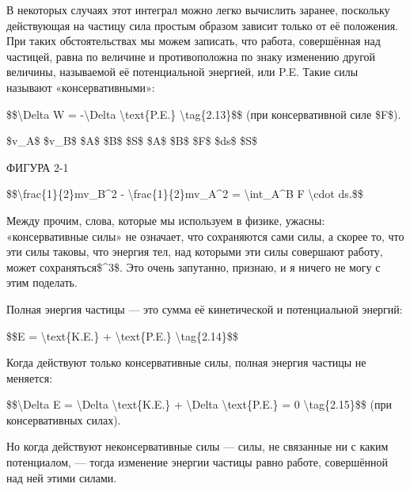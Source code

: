 \documentclass[10pt,oneside]{article}
\newcommand{\TipsRunning}[1]{\par\vspace{2bp}{\centering\footnotesize #1\par}\vspace{2bp}}
\begin{document}
В некоторых случаях этот интеграл можно легко вычислить заранее, поскольку действующая на частицу сила простым образом зависит только от её положения. При таких обстоятельствах мы можем записать, что работа, совершённая над частицей, равна по величине и противоположна по знаку изменению другой величины, называемой её потенциальной энергией, или P.E. Такие силы называют «консервативными»:\par

\$\$\textbackslash{}Delta W = -\textbackslash{}Delta \textbackslash{}text\{P.E.\} \textbackslash{}tag\{2.13\}\$\$ (при консервативной силе \$F\$).\par

\TipsRunning{З А К О Н Ы  И  И Н Т У И Ц И Я \textbackslash{}textbullet\{\} 6 5}

\$v\_A\$ \$v\_B\$ \$A\$ \$B\$ \$S\$ \$A\$ \$B\$ \$F\$ \$ds\$ \$S\$\par

ФИГУРА 2-1\par

\$\$\textbackslash{}frac\{1\}\{2\}mv\_B\textasciicircum{}2 - \textbackslash{}frac\{1\}\{2\}mv\_A\textasciicircum{}2 = \textbackslash{}int\_A\textasciicircum{}B F \textbackslash{}cdot ds.\$\$\par

Между прочим, слова, которые мы используем в физике, ужасны: «консервативные силы» не означает, что сохраняются сами силы, а скорее то, что эти силы таковы, что энергия тел, над которыми эти силы совершают работу, может сохраняться\$\textasciicircum{}3\$. Это очень запутанно, признаю, и я ничего не могу с этим поделать.\par

Полная энергия частицы --- это сумма её кинетической и потенциальной энергий:\par

\$\$E = \textbackslash{}text\{K.E.\} + \textbackslash{}text\{P.E.\}  \textbackslash{}tag\{2.14\}\$\$\par

Когда действуют только консервативные силы, полная энергия частицы не меняется:\par

\$\$\textbackslash{}Delta E = \textbackslash{}Delta \textbackslash{}text\{K.E.\} + \textbackslash{}Delta \textbackslash{}text\{P.E.\} = 0 \textbackslash{}tag\{2.15\}\$\$ (при консервативных силах).\par

Но когда действуют неконсервативные силы --- силы, не связанные ни с каким потенциалом, --- тогда изменение энергии частицы равно работе, совершённой над ней этими силами.\par
\end{document}
